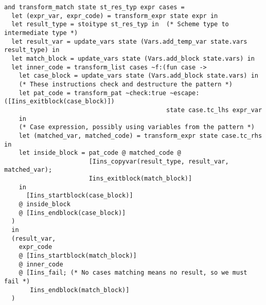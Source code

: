\documentclass[12pt,notitlepage]{report}
\begin{document}
\begin{verbatim}
and transform_match state st_res_typ expr cases =
  let (expr_var, expr_code) = transform_expr state expr in
  let result_type = stoitype st_res_typ in  (* Scheme type to intermediate type *)
  let result_var = update_vars state (Vars.add_temp_var state.vars result_type) in
  let match_block = update_vars state (Vars.add_block state.vars) in
  let inner_code = transform_list cases ~f:(fun case ->
    let case_block = update_vars state (Vars.add_block state.vars) in
    (* These instructions check and destructure the pattern *)
    let pat_code = transform_pat ~check:true ~escape:([Iins_exitblock(case_block)])
                                            state case.tc_lhs expr_var
    in
    (* Case expression, possibly using variables from the pattern *)
    let (matched_var, matched_code) = transform_expr state case.tc_rhs in
    let inside_block = pat_code @ matched_code @
                       [Iins_copyvar(result_type, result_var, matched_var);
                       Iins_exitblock(match_block)]
    in
      [Iins_startblock(case_block)]
    @ inside_block
    @ [Iins_endblock(case_block)]
  )
  in
  (result_var,
    expr_code
    @ [Iins_startblock(match_block)]
    @ inner_code
    @ [Iins_fail; (* No cases matching means no result, so we must fail *)
       Iins_endblock(match_block)]
  )

\end{verbatim}
\end{document}
